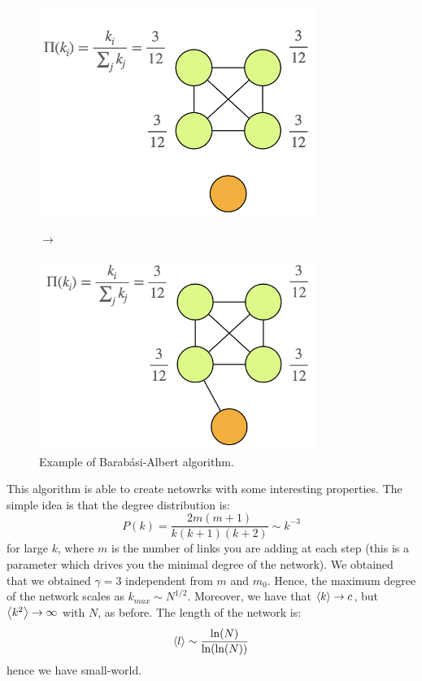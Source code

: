 \documentclass[../main/main.tex]{subfiles}
\begin{document}
\begin{figure}[h!]
\begin{minipage}[c]{0.48\linewidth}
\centering
\includegraphics[width=0.8\textwidth]{../lessons/image/07/6.png}
\end{minipage}
\( \longrightarrow  \)
\begin{minipage}[]{0.48\linewidth}
\centering
\includegraphics[width=0.8\textwidth]{../lessons/image/07/7.png}
\end{minipage}
\caption{\label{fig:07_5} Example of Barabási-Albert algorithm.}
\end{figure}

This algorithm is able to create netowrks with some interesting properties. The simple idea is that the degree distribution is:
\begin{equation*}
  P(k) = \frac{2 m (m +1)}{k(k+1)(k+2)} \sim k^{-3}
\end{equation*}
for large \( k \), where \( m \) is the number of links you are adding at each step (this is a parameter which drives you the minimal degree of the network).
We obtained that we obtained \( \gamma =3  \) independent from \( m \) and \( m_0 \). Hence, the maximum degree of the network scales as \( k_{max} \sim N^{1/2} \). Moreover, we have that \( \expval{k} \rightarrow c \), but \( \expval{k^2} \rightarrow \infty   \) with \( N \), as before.
The length of the network is:
\begin{equation*}
  \expval{l} \sim \frac{\ln (N)}{\ln (\ln (N))}
\end{equation*}
hence we have small-world.
\end{document}
